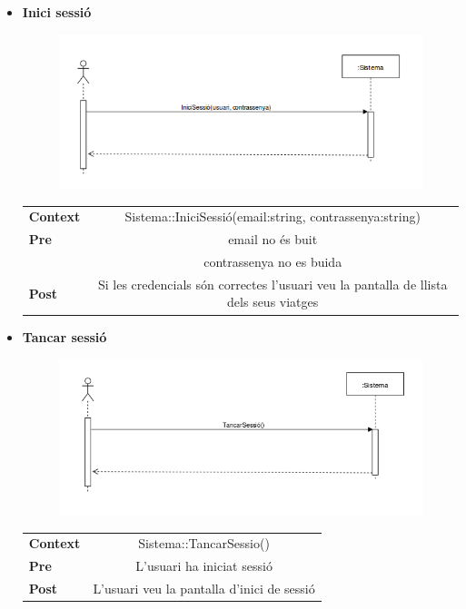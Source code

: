 \begin{itemize}
\item[]{\textbf{Inici sessió}}

\begin{figure}[!h]
\centering
\includegraphics[scale=0.8]{Figures/IniciSessioEC.png}
\end{figure}

\begin{table}[!h]
\begin{tabular}{l C}
\textbf{Context}  & Sistema::IniciSessió(email:string, contrassenya:string) \\
\textbf{Pre} & email no és buit\\
 & contrassenya no es buida\\
\textbf{Post} &  Si les credencials són correctes l'usuari veu la pantalla de llista dels seus viatges\\
\end{tabular}
\label{}
\end{table}

\clearpage

\item[]{\textbf{Tancar sessió}}

\begin{figure}[!h]
\centering
\includegraphics[scale=0.8]{Figures/TancarSessioEC.png}
\end{figure}

\begin{table}[!h]
\begin{tabular}{l C}
\textbf{Context}  & Sistema::TancarSessio() \\
\textbf{Pre} & L'usuari ha iniciat sessió\\
\textbf{Post} &  L'usuari veu la pantalla d'inici de sessió\\
\end{tabular}
\label{}
\end{table}


\end{itemize}
